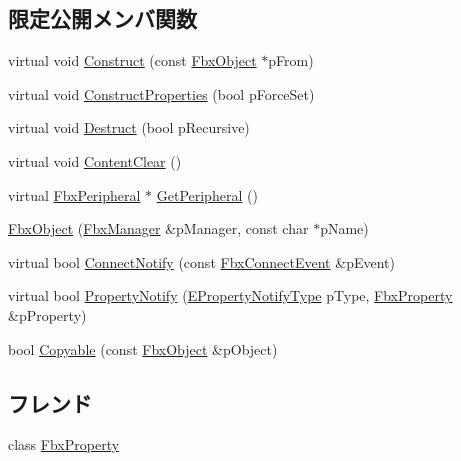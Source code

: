 \subsection*{限定公開メンバ関数}
\begin{DoxyCompactItemize}
\item 
virtual void \hyperlink{class_fbx_object_a313503bc645af3fdceb4a99ef5cea7eb}{Construct} (const \hyperlink{class_fbx_object}{Fbx\+Object} $\ast$p\+From)
\item 
virtual void \hyperlink{class_fbx_object_ad44f814323dc1b5e78bff1bfc608b4bb}{Construct\+Properties} (bool p\+Force\+Set)
\item 
virtual void \hyperlink{class_fbx_object_a123e084d9b32b29c28af6384b7c3c608}{Destruct} (bool p\+Recursive)
\item 
virtual void \hyperlink{class_fbx_object_a284f2a438579fcacd8bffd85f556dde2}{Content\+Clear} ()
\item 
virtual \hyperlink{class_fbx_peripheral}{Fbx\+Peripheral} $\ast$ \hyperlink{class_fbx_object_a7aef9083f559702547871bedbf0d6b5a}{Get\+Peripheral} ()
\item 
\hyperlink{class_fbx_object_a87981fe7a05df318be39146a1493d1cc}{Fbx\+Object} (\hyperlink{class_fbx_manager}{Fbx\+Manager} \&p\+Manager, const char $\ast$p\+Name)
\item 
virtual bool \hyperlink{class_fbx_object_ab7a400f3829d1f0da57d3d78c8168dd0}{Connect\+Notify} (const \hyperlink{class_fbx_connect_event}{Fbx\+Connect\+Event} \&p\+Event)
\item 
virtual bool \hyperlink{class_fbx_object_a68b9ad65d98d7be9cb252949bc709385}{Property\+Notify} (\hyperlink{class_fbx_object_a528f1b2c2b7abbd64c525ba3a9a496b8}{E\+Property\+Notify\+Type} p\+Type, \hyperlink{class_fbx_property}{Fbx\+Property} \&p\+Property)
\item 
bool \hyperlink{class_fbx_object_a1044dfc8f3321b2ba23a95076d8ad7f9}{Copyable} (const \hyperlink{class_fbx_object}{Fbx\+Object} \&p\+Object)
\end{DoxyCompactItemize}
\subsection*{フレンド}
\begin{DoxyCompactItemize}
\item 
class \hyperlink{class_fbx_object_a5d7018830479ec28905f28575480f88f}{Fbx\+Property}
\end{DoxyCompactItemize}
